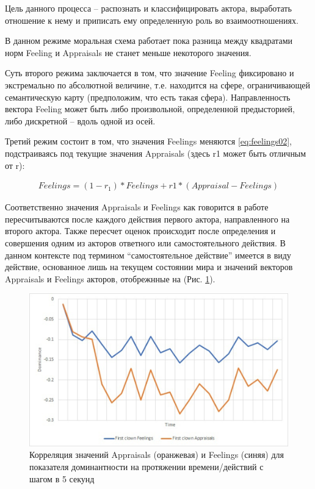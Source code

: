 Цель данного процесса – распознать и классифицировать актора, выработать отношение к нему и приписать ему определенную роль во взаимоотношениях. 

В данном режиме моральная схема работает пока разница между квадратами норм Feeling и Appraisals не станет меньше некоторого значения.

Суть второго режима заключается в том, что значение Feeling фиксировано и экстремально по абсолютной величине, т.е. находится на сфере, 
ограничивающей семантическую карту (предположим, что есть такая сфера). Направленность вектора Feeling может быть либо произвольной, 
определенной предысторией, либо дискретной – вдоль одной из осей.

Третий режим состоит в том, что значения Feelings меняются \ref{eq:feelings02}, подстраиваясь под текущие значения Appraisals (здесь r1 может быть отличным от r): 

\begin{equation}
  \begin{gathered}
    Feelings=(1-r_1 )*Feelings+r1*(Appraisal-Feelings)
  \end{gathered}
  \label{eq:feelings02}
\end{equation}

Соответственно значения Appraisals и Feelings как говорится в работе \cite{Samsonovich05} пересчитываются после каждого действия первого актора, направленного на второго актора.
Также пересчет оценок происходит после определения и совершения одним из акторов ответного или самостоятельного действия. 
В данном контексте под термином “самостоятельное действие” имеется в виду действие, основанное лишь на текущем состоянии мира и 
значений векторов Appraisals и Feelings акторов, отобрежнные на (Рис. \ref{pic:ris8}). 


\begin{figure}[h]
\includegraphics[width=0.75\columnwidth]{./img/ris8.png}
\centering
\caption{Корреляция значений Appraisals (оранжевая) и Feelings (синяя) для показателя доминантности на протяжении времени/действий с шагом в 5 секунд}
\label{pic:ris8}
\end{figure}

